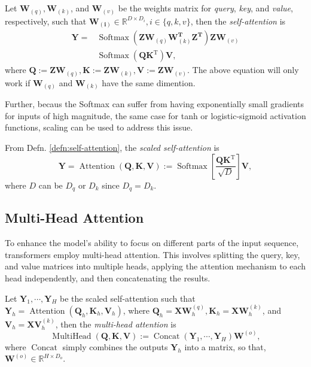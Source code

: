 \begin{defn}\label{defn:self-attention}
    Let $\mathbf{W}_{(q)},\mathbf{W}_{(k)}$, and $\mathbf{W}_{(v)}$ be the weights matrix for \textit{query}, \textit{key}, and \textit{value}, respectively, such that $\mathbf{W_{(i)}}\in\mathbb{R}^{D\times D_i},i\in\{q,k,v\}$, then the \textit{self-attention} is 
    \begin{align}
        \mathbf{Y}=&\operatorname{Softmax}(\mathbf{Z}\mathbf{W}_{(q)}\mathbf{W}_{(k)}^{\mathbf{T}}\mathbf{Z}^{\mathbf{T}})\mathbf{Z}\mathbf{W}_{(v)}\\
        &\operatorname{Softmax}(\mathbf{Q}\mathbf{K}^{\text{T}})\mathbf{V},
    \end{align}
    where $\mathbf{Q}:=\mathbf{Z}\mathbf{W}_{(q)},\mathbf{K}:=\mathbf{Z}\mathbf{W}_{(k)},\mathbf{V}:=\mathbf{Z}\mathbf{W}_{(v)}$. The above equation will only work if $\mathbf{W}_{(q)}$ and $\mathbf{W}_{(k)}$ have the same dimention.
\end{defn}

Further, becaus the Softmax can suffer from having exponentially small gradients for inputs of high magnitude, the same case for tanh or logistic-sigmoid activation functions, scaling can be used to address this issue.

\begin{defn}
    From Defn. \ref{defn:self-attention}, the \textit{scaled self-attention} is
    \begin{equation}
        \mathbf{Y}=\operatorname{Attention}(\mathbf{Q},\mathbf{K},\mathbf{V}):=\operatorname{Softmax}\left[\frac{\mathbf{Q}\mathbf{K}^{\text{T}}}{\sqrt{D}}\right]\mathbf{V},
    \end{equation}
    where $D$ can be $D_q$ or $D_k$ since $D_q=D_k$.
\end{defn}

\subsection{Multi-Head Attention}
To enhance the model's ability to focus on different parts of the input sequence, transformers employ multi-head attention. This involves splitting the query, key, and value matrices into multiple heads, applying the attention mechanism to each head independently, and then concatenating the results.
\begin{defn}
    Let $\mathbf{Y}_1,\cdots,\mathbf{Y}_H$ be the scaled self-attention such that $\mathbf{Y}_h=\operatorname{Attention}(\mathbf{Q}_h,\mathbf{K}_h,\mathbf{V}_h)$, where $\mathbf{Q}_h=\mathbf{X}\mathbf{W}_h^{(q)},\mathbf{K}_h=\mathbf{X}\mathbf{W}_h^{(k)}$, and $\mathbf{V}_h=\mathbf{X}\mathbf{V}_h^{(k)}$, then the \textit{multi-head attention} is
    \begin{equation}
        \operatorname{MultiHead}(\mathbf{Q},\mathbf{K},\mathbf{V}):=\operatorname{Concat}(\mathbf{Y}_1,\cdots,\mathbf{Y}_H)\mathbf{W}^{(o)},
    \end{equation}
    where $\operatorname{Concat}$ simply combines the outputs $\mathbf{Y}_h$ into a matrix, so that, $\mathbf{W}^{(o)}\in\mathbb{R}^{H\times D_o}$.
\end{defn}
